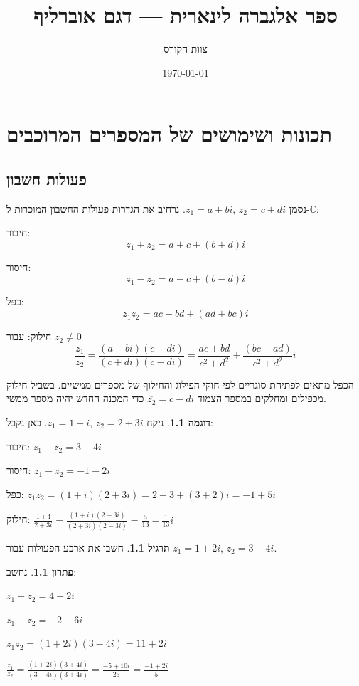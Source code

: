 \documentclass[12pt]{report}
\title{ספר אלגברה לינארית — דגם אוברליף}
\author{צוות הקורס}
\date{\today}
\theoremstyle{plain}
\theoremstyle{definition}
\newtheorem{example}{דוגמה}[chapter]
\newtheorem{exercise}{תרגיל}[chapter]
\newtheorem*{solution}{פתרון}
\newcommand{\C}{\mathbb{C}}
\newcommand{\0}{\mathbf{0}}
\begin{document}
\maketitle

\chapter{תכונות ושימושים של המספרים המרוכבים}\label{ch:complex}

\section{פעולות חשבון}

נסמן $z_{1}=a+bi,\,z_{2}=c+di$. נרחיב את הגדרות פעולות החשבון
המוכרות ל-$\C$:

חיבור: $$z_{1}+z_{2}=a+c+(b+d)i$$

חיסור: $$z_{1}-z_{2}=a-c+(b-d)i$$

כפל: $$z_{1}z_{2}=ac-bd+(ad+bc)i$$

חילוק: עבור
$z_{2}\neq0$
$$\frac{z_{1}}{z_{2}}=\frac{(a+bi)(c-di)}{(c+di)(c-di)}=\frac{ac+bd}{c^{2}+d^{2}}+\frac{(bc-ad)}{c^{2}+d^{2}}i$$


הכפל מתאים לפתיחת סוגריים לפי חוקי הפילוג והחילוף של מספרים ממשיים.
בשביל חילוק מכפילים ומחלקים במספר הצמוד $\overline{z_{2}}=c-di$
כדי המכנה החדש יהיה מספר ממשי.

\begin{example}
ניקח $z_{1}=1+i,\,z_{2}=2+3i$. כאן נקבל:

חיבור: $z_{1}+z_{2}=3+4i$

חיסור: $z_{1}-z_{2}=-1-2i$

כפל: $z_{1}z_{2}=(1+i)(2+3i)=2-3+(3+2)i=-1+5i$

חילוק: $\frac{1+\text{i}}{2+3i}=\frac{(1+i)(2-3i)}{(2+3i)(2-3i)}=\frac{5}{13}-\frac{1}{13}i$
\end{example}

\begin{exercise}
חשבו את ארבע הפעולות עבור $z_{1}=1+2i,\,z_{2}=3-4i$.
\end{exercise}

\begin{solution}
נחשב:

$z_{1}+z_{2}=4-2i$

$z_{1}-z_{2}=-2+6i$

$z_{1}z_{2}=(1+2i)(3-4i)=11+2i$

$\frac{z_1}{z_2}=\frac{(1+2i)(3+4i)}{(3-4i)(3+4i)}=\frac{-5+10i}{25}=\frac{-1+2i}{5}$

\end{solution}
\end{document}
